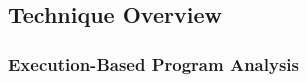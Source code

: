 \subsection{Technique Overview}
\label{sec:intro-overview}
\subsubsection{Execution-Based Program Analysis}
\label{sec:intro-exe}
